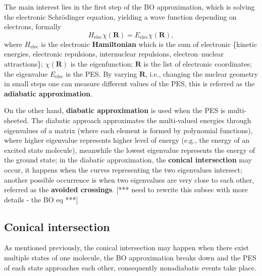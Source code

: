 \documentclass[12pt]{article}
\def\att{                    %
        \marginpar[ \hspace*{\fill} \raisebox{-0.2em}{\rule{2mm}{1.2em}} ]
        {\raisebox{-0.2em}{\rule{2mm}{1.2em}} }
        }
\def\at#1{[*** \att #1 ***]}  %
\begin{document}
The main interest lies in the first step of the BO approximation, which is solving the electronic Schrödinger equation, yielding a wave function depending on electrons, formally
\begin{equation}
    H_{\text{elec}}\chi(\mathbf{R}) = E_{\text{elec}}\chi(\mathbf{R}),
    \label{eq:introbo}
\end{equation}
where $H_{\text{elec}}$ is the electronic \textbf{Hamiltonian} which is the sum of electronic \{kinetic energies, electronic repulsions, internuclear repulsions, electron--nuclear attractions\}; $\chi(\mathbf{R})$ is the eigenfunction; $\mathbf{R}$ is the list of electronic coordinates; the eigenvalue $E_{\text{elec}}$ is the PES. By varying $\mathbf{R}$, i.e., changing the nuclear geometry in small steps one can measure different values of the PES, this is referred as the \textbf{adiabatic approximation}.

On the other hand, \textbf{diabatic approximation} is used when the PES is multi-sheeted. The diabatic approach approximates the multi-valued energies through eigenvalues of a matrix (where each element is formed by polynomial functions), where higher eigenvalue represents higher level of energy (e.g., the energy of an excited state molecule), meanwhile the lowest eigenvalue represents the energy of the ground state; in the diabatic approximation, the \textbf{conical intersection} may occur, it happens when the curves representing the two eigenvalues intersect; another possible occurrence is when two eigenvalues are very close to each other, referred as the \textbf{avoided crossings}.
\at{need to rewrite this subsec with more details - the BO eq}

\subsection{Conical intersection}
As mentioned previously, the conical intersection may happen when there exist multiple states of one molecule, the BO approximation breaks down and the PES of each state approaches each other, consequently nonadiabatic events take place. 
\end{document}
